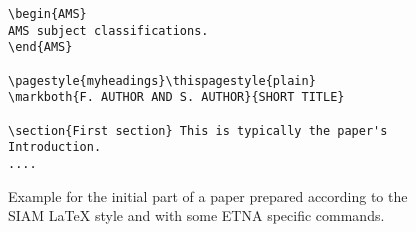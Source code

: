 \documentclass[10pt]{article}
\begin{document}
\begin{figure}
\begin{verbatim}
\begin{AMS}
AMS subject classifications.
\end{AMS}

\pagestyle{myheadings}\thispagestyle{plain}
\markboth{F. AUTHOR AND S. AUTHOR}{SHORT TITLE}

\section{First section} This is typically the paper's Introduction.
....
\end{verbatim}
\caption{Example for the initial part of a paper prepared according to the
SIAM {\LaTeX} style and with some ETNA specific commands.}\label{fig:preamble}
\end{figure}
\end{document}
